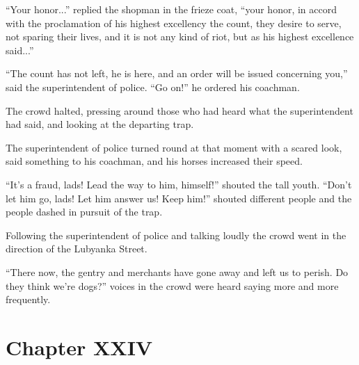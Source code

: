 ``Your honor...'' replied the shopman in the frieze coat, ``your
honor, in accord with the proclamation of his highest excellency
the count, they desire to serve, not sparing their lives, and it
is not any kind of riot, but as his highest excellence said...''

``The count has not left, he is here, and an order will be issued
concerning you,'' said the superintendent of police. ``Go on!''
he ordered his coachman.

The crowd halted, pressing around those who had heard what the
superintendent had said, and looking at the departing trap.

The superintendent of police turned round at that moment with a
scared look, said something to his coachman, and his horses
increased their speed.

``It's a fraud, lads! Lead the way to him, himself!'' shouted the
tall youth. ``Don't let him go, lads! Let him answer us! Keep
him!'' shouted different people and the people dashed in pursuit
of the trap.

Following the superintendent of police and talking loudly the
crowd went in the direction of the Lubyanka Street.

``There now, the gentry and merchants have gone away and left us
to perish. Do they think we're dogs?'' voices in the crowd were
heard saying more and more frequently.


\chapter*{Chapter XXIV} \ifaudio {}
\fi

